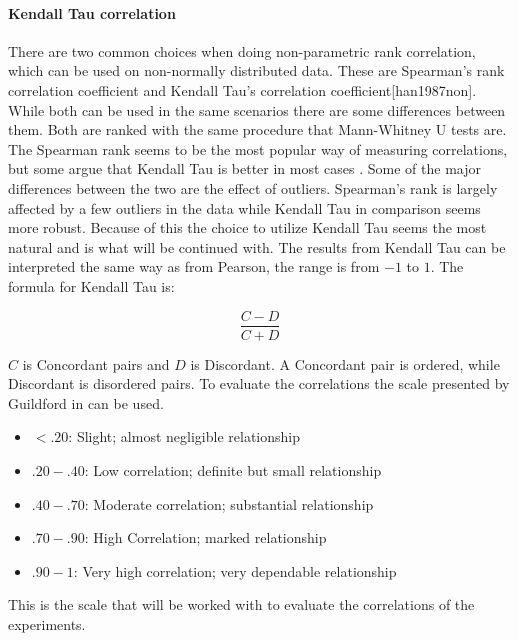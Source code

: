 \paragraph{Kendall Tau correlation}
There are two common choices when doing non-parametric rank correlation, which can be used on non-normally distributed data. These are Spearman's rank correlation coefficient and Kendall Tau's correlation coefficient[han1987non]. While both can be used in the same scenarios there are some differences between them. Both are ranked with the same procedure that Mann-Whitney U tests are. The Spearman rank seems to be the most popular way of measuring correlations, but some argue that Kendall Tau is better in most cases \cite{gilpin1993table}. Some of the major differences between the two are the effect of outliers. Spearman's rank is largely affected by a few outliers in the data while Kendall Tau in comparison seems more robust. Because of this the choice to utilize Kendall Tau seems the most natural and is what will be continued with. The results from Kendall Tau can be interpreted the same way as from Pearson, the range is from $-1$ to $1$. The formula for Kendall Tau is:

\begin{equation}
    \frac{C-D}{C+D}
\end{equation}

$C$ is Concordant pairs and $D$ is Discordant. A Concordant pair is ordered, while Discordant is disordered pairs\cite{kendall1938new}. To evaluate the correlations the scale presented by Guildford in \cite[219]{guilford1950fundamental} can be used.
\begin{itemize}
    \item $<.20$: Slight; almost negligible relationship
    \item $.20-.40$: Low correlation; definite but small relationship
    \item $.40-.70$: Moderate correlation; substantial relationship
    \item $.70-.90$: High Correlation; marked relationship
    \item $.90-1$: Very high correlation; very dependable relationship
\end{itemize}

This is the scale that will be worked with to evaluate the correlations of the experiments.


